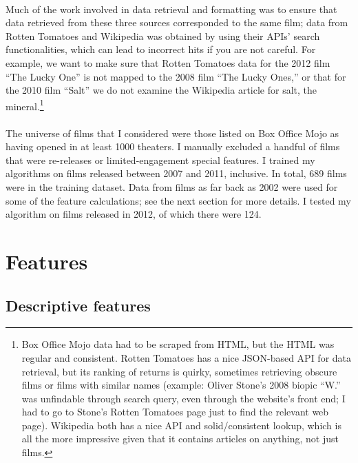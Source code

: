 \documentclass[10pt]{article}
\begin{document}
    \paragraph{}
    Much of the work involved in data retrieval and formatting was to ensure that data retrieved from these three sources corresponded to the same film; data from Rotten Tomatoes and Wikipedia was obtained by using their APIs' search functionalities, which can lead to incorrect hits if you are not careful. For example, we want to make sure that Rotten Tomatoes data for the 2012 film ``The Lucky One'' is not mapped to the 2008 film ``The Lucky Ones,'' or that for the 2010 film ``Salt'' we do not examine the Wikipedia article for salt, the mineral.\footnote{Box Office Mojo data had to be scraped from HTML, but the HTML was regular and consistent. Rotten Tomatoes has a nice JSON-based API for data retrieval, but its ranking of returns is quirky, sometimes retrieving obscure films or films with similar names (example: Oliver Stone's 2008 biopic ``W.'' was unfindable through search query, even through the website's front end; I had to go to Stone's Rotten Tomatoes page just to find the relevant web page). Wikipedia both has a nice API and solid/consistent lookup, which is all the more impressive given that it contains articles on anything, not just films.} 
    
    \paragraph{}
    The universe of films that I considered were those listed on Box Office Mojo as having opened in at least 1000 theaters. I manually excluded a handful of films that were re-releases or limited-engagement special features. I trained my algorithms on films released between 2007 and 2011, inclusive. In total, 689 films were in the training dataset. Data from films as far back as 2002 were used for some of the feature calculations; see the next section for more details. I tested my algorithm on films released in 2012, of which there were 124. 
    
    \section{Features}
    
    \subsection{Descriptive features}
    
\end{document}
